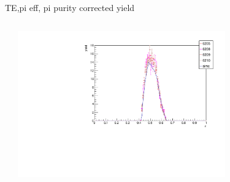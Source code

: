 \begin{frame}{TE,pi eff, pi purity corrected yield}
\begin{columns}
\begin{column}[T]{0.5\textwidth}
\end{column}
\begin{column}[T]{0.5\textwidth}
\includegraphics[width = 0.7\textwidth]{results/yield/check/yieldcheck_170_pos.pdf}
\end{column}
\end{columns}
\end{frame}
